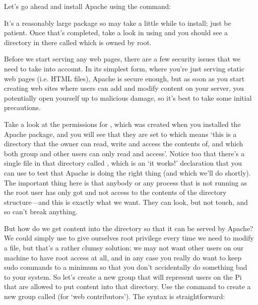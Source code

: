 Let's go ahead and install Apache using the command:


It's a reasonably large package so may take a little while to install; just be patient. Once that's completed, take a look in  using  and you should see a directory in there called  which is owned by root.

Before we start serving any web pages, there are a few security issues that we need to take into account. In its simplest form, where you're just serving static web pages (i.e. HTML files), Apache is secure enough, but as soon as you start creating web sites where users can add and modify content on your server, you potentially open yourself up to malicious damage, so it's best to take some initial precautions. 

Take a look at the permissions for , which was created when you installed the Apache package, and you will see that they are set to  which means `this is a directory that the owner can read, write and access the contents of, and which both group and other users can only read and access'. Notice too that there's a single file in that directory called , which is an `it works!' declaration that you can use to test that Apache is doing the right thing (and which we'll do shortly). The important thing here is that anybody or any process that is not running as the root user has only got  and not  access to the contents of the  directory structure---and this is exactly what we want. They can look, but not touch, and so can't break anything. 

But how do we get content into the  directory so that it can be served by Apache? We could simply use  to give ourselves root privilege every time we need to modify a file, but that's a rather clumsy solution: we may not want other users on our machine to have root access at all, and in any case you really do want to keep sudo commands to a minimum so that you don't accidentally do something bad to your system. So let's create a new group that will represent users on the Pi that are allowed to put content into that directory. Use the command  to create a new group called  (for `web contributors'). The syntax is straightforward:

